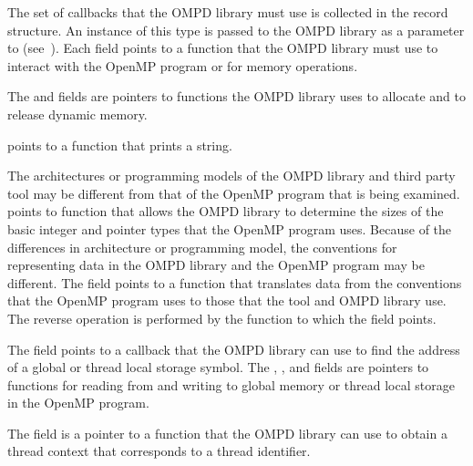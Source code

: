 \descr
The set of callbacks that the OMPD library must use is collected in the 
 record structure. An instance of this type is passed 
to the OMPD library as a parameter to  
(see~). Each field points to a function 
that the OMPD library must use to interact with the OpenMP program or for 
memory operations.

The  and  fields are pointers to functions 
the OMPD library uses to allocate and to release dynamic memory.

 points to a function that prints a string.

The architectures or programming models of the OMPD library and third party 
tool may be different from that of the OpenMP program that is being examined.
 points to function that allows the OMPD library to determine 
the sizes of the basic integer and pointer types that the OpenMP program uses.
Because of the differences in architecture or programming model, the conventions 
for representing data in the OMPD library and the OpenMP program may be different.
The  field points to a function that translates data from the 
conventions that the OpenMP program uses to those that the tool and OMPD library
use. The reverse operation is performed by the function to which the 
 field points.

The  field points to a callback that the OMPD library 
can use to find the address of a global or thread local storage symbol. The 
,  , and  fields are 
pointers to functions for reading from and writing to global memory or 
thread local storage in the OpenMP program.

The  field is a pointer to a function
that the OMPD library can use to obtain a thread context that corresponds to
a thread identifier.

